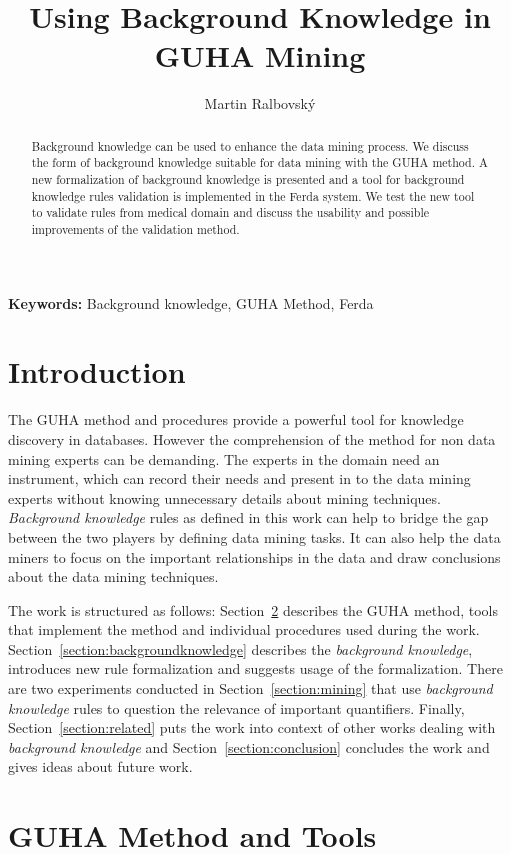 \documentclass{llncs}
\title{Using Background Knowledge in GUHA Mining}
\author{Martin Ralbovsk\'{y}}
\institute{Department of Information and Knowledge Engineering,\\
University of Economics, Prague, W. Churchill Sq.~4, 130 67 Praha~3, Czech Republic
\\\email{martin.ralbovsky@gmail.com}}
\begin{document}
\maketitle

\begin{abstract}
Background knowledge can be used to enhance the data mining process. We discuss
the form of background knowledge suitable for data mining with the GUHA method.
A new formalization of background knowledge is presented and a tool for 
background knowledge rules validation is implemented in the Ferda system. We
test the new tool to validate rules from medical domain and discuss the usability
and possible improvements of the validation method. 
\end{abstract}

{\small {\bf Keywords:} Background knowledge, GUHA Method, Ferda}

\section{Introduction}
The GUHA method and procedures provide a powerful tool for knowledge discovery
in databases. However the comprehension of the method for non data mining
experts can be demanding. The experts in the domain need an instrument, which
can record their needs and present in to the data mining experts without 
knowing unnecessary details about mining techniques. \emph{Background knowledge}
rules as defined in this work can help to bridge the gap between the two 
players by defining data mining tasks. It can also help the data miners
to focus on the important relationships in the data and draw conclusions
about the data mining techniques.

The work is structured as follows: Section~\ref{section:guha} describes the
GUHA method, tools that implement the method and individual procedures used during
the work. Section~\ref{section:backgroundknowledge} describes the \emph{background
knowledge}, introduces new rule formalization and suggests usage of the formalization.
There are two experiments conducted in Section~\ref{section:mining} that use
\emph{background knowledge} rules to question the relevance of important quantifiers.
Finally, Section~\ref{section:related} puts the work into context of other works
dealing with \emph{background knowledge} and Section~\ref{section:conclusion} concludes
the work and gives ideas about future work.

\section{GUHA Method and Tools}
\label{section:guha}
\end{document}
